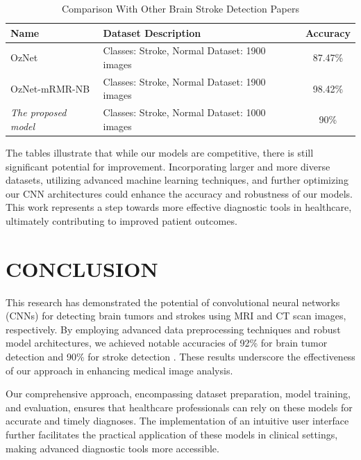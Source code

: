 \documentclass[conference]{IEEEtran}
\begin{document}
\begin{table}[htbp]
\caption{Comparison With Other Brain Stroke Detection Papers}
\begin{center}
\begin{tabular}{|p{2cm}|p{4cm}|c|}
\hline
\textbf{Name} & \textbf{Dataset Description} & \textbf{Accuracy} \\
\hline
OzNet \cite{bioengineering9120783} & Classes: Stroke, Normal \newline Dataset: 1900 images & 87.47\% \\
\hline
OzNet-mRMR-NB \cite{bioengineering9120783} & Classes: Stroke, Normal \newline Dataset: 1900 images & 98.42\% \\
\hline
\emph{The proposed model} & Classes: Stroke, Normal \newline Dataset: 1000 images & 90\% \\
\hline
\end{tabular}
\label{tab:brain_stroke_comparison}
\end{center}
\end{table}

The tables illustrate that while our models are competitive, there is still significant potential for improvement. Incorporating larger and more diverse datasets, utilizing advanced machine learning techniques, and further optimizing our CNN architectures could enhance the accuracy and robustness of our models. This work represents a step towards more effective diagnostic tools in healthcare, ultimately contributing to improved patient outcomes.



\section{CONCLUSION}

This research has demonstrated the potential of convolutional neural networks (CNNs) for detecting brain tumors and strokes using MRI and CT scan images, respectively. By employing advanced data preprocessing techniques and robust model architectures, we achieved notable accuracies of 92\% for brain tumor detection \cite{br35h} and 90\% for stroke detection \cite{bioengineering9120783}. These results underscore the effectiveness of our approach in enhancing medical image analysis.

Our comprehensive approach, encompassing dataset preparation, model training, and evaluation, ensures that healthcare professionals can rely on these models for accurate and timely diagnoses. The implementation of an intuitive user interface further facilitates the practical application of these models in clinical settings, making advanced diagnostic tools more accessible.
\end{document}

